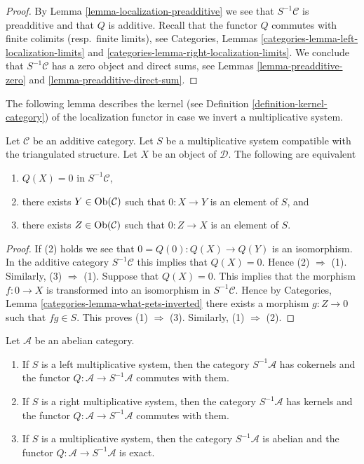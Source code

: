 \begin{proof}
By
Lemma \ref{lemma-localization-preadditive}
we see that $S^{-1}\mathcal{C}$ is preadditive and that $Q$ is additive.
Recall that the functor $Q$ commutes with finite colimits
(resp.\ finite limits), see
Categories, Lemmas \ref{categories-lemma-left-localization-limits} and
\ref{categories-lemma-right-localization-limits}.
We conclude that $S^{-1}\mathcal{C}$ has a zero object and
direct sums, see
Lemmas \ref{lemma-preadditive-zero} and
\ref{lemma-preadditive-direct-sum}.
\end{proof}

\noindent
The following lemma describes the kernel (see
Definition \ref{definition-kernel-category})
of the localization functor in case we invert a multiplicative system.

\begin{lemma}
\label{lemma-kernel-localization}
Let $\mathcal{C}$ be an additive category. Let $S$ be a multiplicative
system compatible with the triangulated structure. Let $X$ be an object
of $\mathcal{D}$. The following are equivalent
\begin{enumerate}
\item $Q(X) = 0$ in $S^{-1}\mathcal{C}$,
\item there exists $Y \in \mathop{\rm Ob}\nolimits(\mathcal{C})$ such that
$0 : X \to Y$ is an element of $S$, and
\item there exists $Z \in \mathop{\rm Ob}\nolimits(\mathcal{C})$ such that
$0 : Z \to X$ is an element of $S$.
\end{enumerate}
\end{lemma}

\begin{proof}
If (2) holds we see that $0 = Q(0) : Q(X) \to Q(Y)$ is an isomorphism.
In the additive category $S^{-1}\mathcal{C}$ this implies that $Q(X) = 0$.
Hence (2) $\Rightarrow$ (1). Similarly, (3) $\Rightarrow$ (1).
Suppose that $Q(X) = 0$. This implies that the morphism
$f : 0 \to X$ is transformed into an isomorphism in $S^{-1}\mathcal{C}$.
Hence by
Categories, Lemma \ref{categories-lemma-what-gets-inverted}
there exists a morphism $g : Z \to 0$ such that $fg \in S$. This proves
(1) $\Rightarrow$ (3). Similarly, (1) $\Rightarrow$ (2).
\end{proof}

\begin{lemma}
\label{lemma-localization-abelian}
Let $\mathcal{A}$ be an abelian category.
\begin{enumerate}
\item If $S$ is a left multiplicative system, then
the category $S^{-1}\mathcal{A}$ has cokernels and the functor
$Q : \mathcal{A} \to S^{-1}\mathcal{A}$ commutes with them.
\item If $S$ is a right multiplicative system, then
the category $S^{-1}\mathcal{A}$ has kernels and the functor
$Q : \mathcal{A} \to S^{-1}\mathcal{A}$ commutes with them.
\item If $S$ is a multiplicative system, then the category
$S^{-1}\mathcal{A}$ is abelian and the functor
$Q : \mathcal{A} \to S^{-1}\mathcal{A}$ is exact.
\end{enumerate}
\end{lemma}

